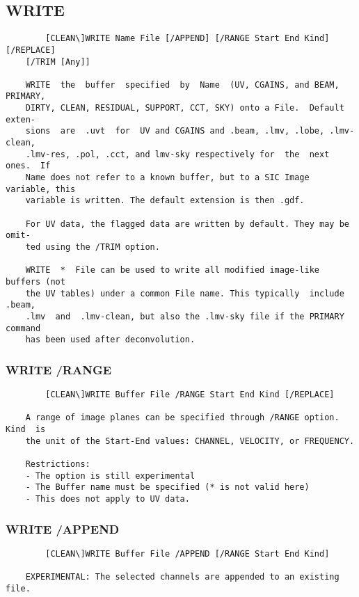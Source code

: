 \subsection{WRITE}
\begin{verbatim}
        [CLEAN\]WRITE Name File [/APPEND] [/RANGE Start End Kind] [/REPLACE]
    [/TRIM [Any]]

    WRITE  the  buffer  specified  by  Name  (UV, CGAINS, and BEAM, PRIMARY,
    DIRTY, CLEAN, RESIDUAL, SUPPORT, CCT, SKY) onto a File.  Default  exten-
    sions  are  .uvt  for  UV and CGAINS and .beam, .lmv, .lobe, .lmv-clean,
    .lmv-res, .pol, .cct, and lmv-sky respectively for  the  next  ones.  If
    Name does not refer to a known buffer, but to a SIC Image variable, this
    variable is written. The default extension is then .gdf.

    For UV data, the flagged data are written by default. They may be  omit-
    ted using the /TRIM option.

    WRITE  *  File can be used to write all modified image-like buffers (not
    the UV tables) under a common File name. This typically  include  .beam,
    .lmv  and  .lmv-clean, but also the .lmv-sky file if the PRIMARY command
    has been used after deconvolution.

\end{verbatim}
\subsubsection{WRITE /RANGE}
\begin{verbatim}
        [CLEAN\]WRITE Buffer File /RANGE Start End Kind [/REPLACE]

    A range of image planes can be specified through /RANGE option. Kind  is
    the unit of the Start-End values: CHANNEL, VELOCITY, or FREQUENCY.

    Restrictions:
    - The option is still experimental
    - The Buffer name must be specified (* is not valid here)
    - This does not apply to UV data.

\end{verbatim}
\subsubsection{WRITE /APPEND}
\begin{verbatim}
        [CLEAN\]WRITE Buffer File /APPEND [/RANGE Start End Kind]

    EXPERIMENTAL: The selected channels are appended to an existing file.

\end{verbatim}
